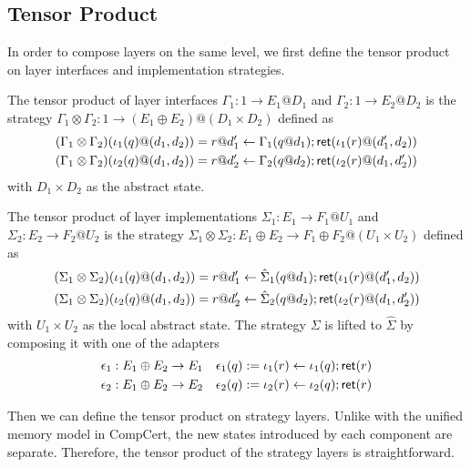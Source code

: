 \documentclass[acmsmall,review,anonymous]{acmart}\settopmatter{printfolios=true,printccs=false,printacmref=false}
\begin{document}
\subsection{Tensor Product} %
\label{sec:stcal:tcomp}
In order to compose layers
on the same level,
we first define
the tensor product
on layer interfaces
and implementation strategies.
\begin{definition}
  The tensor product of layer interfaces
  $\Gamma_1 : 1 \rightarrow E_1@D_1$
  and $\Gamma_2 : 1 \rightarrow E_2@D_2$
  is the strategy
  $\Gamma_1 \otimes \Gamma_2:
  1 \rightarrow (E_1\oplus E_2) @ (D_1 \times D_2)$
  defined as
  \begin{align*}
    & (\Gamma_1 \otimes \Gamma_2)(\iota_1(q)@(d_1,d_2)) =
      r@d'_1 \leftarrow \Gamma_1(q@d_1);  \mathsf{ret} (\iota_1(r)@(d'_1, d_2))\\
    & (\Gamma_1 \otimes \Gamma_2)(\iota_2(q)@(d_1,d_2)) =
      r@d'_2 \leftarrow \Gamma_2(q@d_2);  \mathsf{ret} (\iota_2(r)@(d_1, d'_2))
  \end{align*}
  with $D_1 \times D_2$ as the abstract state.

  The tensor product of layer implementations
  $\Sigma_1: E_1 \rightarrow F_1@U_1$
  and $\Sigma_2: E_2 \rightarrow F_2@U_2$
  is the strategy
  $\Sigma_1 \otimes \Sigma_2:
  E_1\oplus E_2 \rightarrow F_1\oplus F_2@(U_1 \times U_2)$
  defined as
  \begin{align*}
    & (\Sigma_1 \otimes \Sigma_2)(\iota_1(q)@(d_1,d_2)) =
      r@d'_1 \leftarrow \hat{\Sigma}_1(q@d_1);  \mathsf{ret} (\iota_1(r)@(d'_1, d_2))\\
    & (\Sigma_1 \otimes \Sigma_2)(\iota_2(q)@(d_1,d_2)) =
      r@d'_2 \leftarrow \hat{\Sigma}_2(q@d_2);  \mathsf{ret} (\iota_2(r)@(d_1, d'_2))
  \end{align*}
  with $U_1 \times U_2$ as the local abstract state.
  The strategy $\Sigma$ is lifted to $\hat{\Sigma}$
  by composing it with one of the adapters
  \begin{align*}
    & \epsilon_1 : E_1 \oplus E_2 \rightarrow E_1
    & \epsilon_1(q) := \iota_1(r) \leftarrow \iota_1(q);  \mathsf{ret} (r)\\
    & \epsilon_2 : E_1 \oplus E_2 \rightarrow E_2
    & \epsilon_2(q) := \iota_2(r) \leftarrow \iota_2(q);  \mathsf{ret} (r)
  \end{align*}
\end{definition}

Then we can define the tensor product
on strategy layers.
Unlike with the unified memory model
in CompCert,
the new states introduced
by each component are separate.
Therefore, the tensor product
of the strategy layers
is straightforward.
\end{document}
